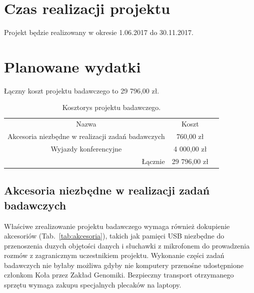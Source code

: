 \documentclass{article}
\begin{document}
\section{Czas realizacji projektu}

Projekt będzie realizowany w okresie 1.06.2017 do 30.11.2017.

\section{Planowane wydatki}

Łączny koszt projektu badawczego to 29 796,00 zł.

\begin{table}[!htbp]
\centering
\caption{Kosztorys projektu badawczego.}
\begin{tabular}{rrr}
\cline{1-2}
\multicolumn{1}{|c}{Nazwa}                                   & \multicolumn{1}{|c|}{Koszt}   &  \\ \cline{1-2}
\multicolumn{1}{|c}{Akcesoria niezbędne w realizacji zadań badawczych}   & 
\multicolumn{1}{|c|}{760,00 zł} &  \\ \cline{1-2}
\multicolumn{1}{|c}{Wyjazdy konferencyjne}   & 
\multicolumn{1}{|c|}{4 000,00 zł} &  \\ \cline{1-2}
Łącznie    & 29 796,00 zł                    & 
\end{tabular}
\end{table}

\subsection{Akcesoria niezbędne w realizacji zadań badawczych}

Właściwe zrealizowanie projektu badawczego wymaga również dokupienie 
akcesoriów (Tab.~\ref{tab:akcesoria}), takich jak pamięci USB niezbędne do 
przenoszenia duzych objętości danych i słuchawki z mikrofonem do prowadzenia 
rozmów z zagranicznym uczestnikiem projektu. Wykonanie części zadań badawczych 
nie byłaby możliwa gdyby nie komputery przenośne udostępnione członkom Koła 
przez Zakład Genomiki. Bezpieczny transport otrzymanego sprzętu wymaga zakupu 
specjalnych plecaków na laptopy.
\end{document}
